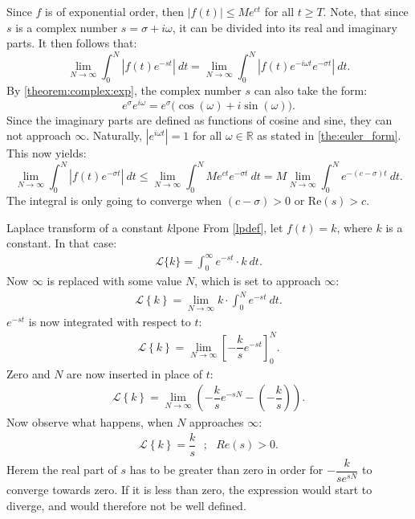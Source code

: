 \begin{prof}{}{}
Since $f$ is of exponential order, then $|f(t)| \leq Me^{ct}$ for all $t \geq T$. Note, that since $s$ is a complex number  $s=\sigma+i\omega$, it can be divided into its real and imaginary parts. It then follows that: $$\lim_{N \to \infty} \int_{0}^{N} \left|f(t)e^{-st} \right|\ dt = \lim_{N \to \infty} \int_{0}^{N} \left|f(t) e^{-i\omega t} e^{-\sigma t} \right| \ dt.$$
By \cref{theorem:complex:exp}, the complex number $s$ can also take the form: 
$$e^{\sigma}e^{i\omega}= e^{\sigma} \big(\cos(\omega)+i\sin(\omega) \big).$$
Since the imaginary parts are defined as functions of cosine and sine, they can not approach $\infty$. Naturally, $\left|e^{i\omega t} \right|=1$ for all $\omega \in \mathbb{R}$ as stated in \cref{the:euler_form}. This now yields: $$\lim_{N \to \infty} \int_{0}^{N} |f(t)e^{-\sigma t}|\ dt \leq \lim_{N \to \infty} \int_{0}^{N} Me^{ct}e^{-\sigma t}\ dt = M \lim_{N \to \infty} \int_{0}^{N}e^{-(c-\sigma)t}\ dt. $$ The integral is only going to converge when $(c-\sigma)>0$ or Re$(s)>c$.
\end{prof}

\begin{example}{Laplace transform of a constant $k$}{lpone}
From \cref{lpdef}, let $f(t)=k$, where $k$ is a constant. In that case:
\begin{align*}
\mathcal{L}\{k\}=\int_{0}^{\infty} e^{-st} \cdot k\ dt.
\end{align*}
Now $\infty$ is replaced with some value $N$, which is set to approach $\infty$:
\begin{align*}
\mathcal{L} \left\{k \right\}= \lim_{N \to \infty} k\cdot \int_{0}^{N} e^{-st}\ dt.
\end{align*}
$e^{-st}$ is now integrated with respect to $t$:
\begin{align*}
\mathcal{L} \left\{k \right\}= \lim_{N \to \infty} \left[ -\dfrac{k}{s} e^{-st} \right]_{0}^{N}.  
\end{align*}
Zero and $N$ are now inserted in place of $t$:
\begin{align*}
\mathcal{L} \left\{k \right\}= \lim_{N \to \infty} \left( -\dfrac{k}{s} e^{-sN} - \left(-\dfrac{k}{s}\right) \right).
\end{align*}
Now observe what happens, when $N$ approaches $\infty$:
\begin{align*}
\mathcal{L} \left\{k \right\}=\dfrac{k}{s} \ \ \ ; \ \ \ Re(s) > 0.
\end{align*}
Herem the real part of $s$ has to be greater than zero in order for $-\dfrac{k}{se^{sN}}$ to converge towards zero. If it is less than zero, the expression would start to diverge, and would therefore not be well defined.
\end{example}

